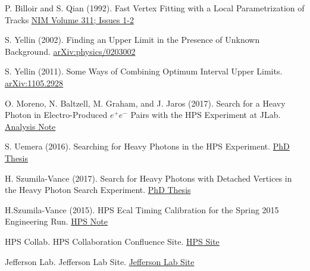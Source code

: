 \documentclass[twoside]{article}
\begin{document}
\begin{thebibliography}{99} %

P. Billoir and S. Qian (1992).
\newblock Fast Vertex Fitting with a Local Parametrization of Tracks
\newblock \href{https://www.sciencedirect.com/science/article/pii/0168900292908593}{NIM Volume 311; Issues 1-2}

S. Yellin (2002).
\newblock Finding an Upper Limit in the Presence of Unknown Background.
\newblock \href{https://arxiv.org/abs/physics/0203002}{arXiv:physics/0203002}

S. Yellin (2011).
\newblock Some Ways of Combining Optimum Interval Upper Limits.
\newblock \href{https://arxiv.org/abs/1105.2928}{arXiv:1105.2928}

O. Moreno, N. Baltzell, M. Graham, and J. Jaros (2017).
\newblock Search for a Heavy Photon in Electro-Produced $e^+e^-$ Pairs with the HPS Experiment at JLab.
\newblock \href{https://confluence.slac.stanford.edu/display/hpsg/Analyses?preview=/211791152/228951493/engrun2015_resonance_search.pdf}{Analysis Note}

S. Uemera (2016).
\newblock Searching for Heavy Photons in the HPS Experiment.
\newblock \href{http://www.slac.stanford.edu/~meeg/thesis/thesis.pdf}{PhD Thesis}

H. Szumila-Vance (2017).
\newblock Search for Heavy Photons with Detached Vertices in the Heavy Photon Search Experiment.
\newblock \href{https://userweb.jlab.org/~hszumila/thesis_24JUL.pdf}{PhD Thesis}

H.Szumila-Vance (2015).
\newblock HPS Ecal Timing Calibration for the Spring 2015 Engineering Run.
\newblock \href{https://misportal.jlab.org/mis/physics/hps_notes/viewFile.cfm/2015-011.pdf?documentId=13}{HPS Note}

HPS Collab.
\newblock HPS Collaboration Confluence Site.
\newblock \href{https://confluence.slac.stanford.edu/display/hpsg/Heavy+Photon+Search+Experiment}{HPS Site}

Jefferson Lab.
\newblock Jefferson Lab Site.
\newblock \href{https://www.jlab.org}{Jefferson Lab Site}

 
\end{thebibliography}

\end{document}
